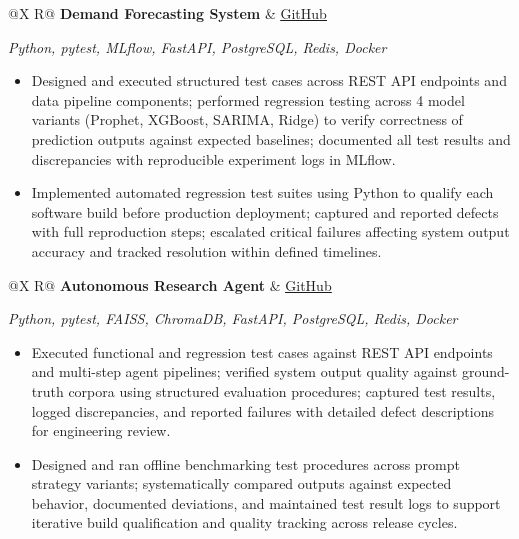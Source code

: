 \documentclass[a4paper,10pt]{article}
\newcommand{\ulink}[2]{\href{#1}{\uline{#2}}}
\newcommand{\subheading}[1]{{\color[HTML]{0A0A0A}\fontsize{12}{14}\selectfont\bfseries #1}}
\newcommand{\techstack}[1]{{\color[HTML]{5C5C5C}\fontsize{10.5}{12.5}\selectfont\itshape #1}}
\newcommand{\meta}[1]{{\color[HTML]{5C5C5C}\fontsize{10.5}{12.5}\selectfont #1}}
\begin{document}
\begin{tabularx}{\linewidth}{@{}X R@{}}
\subheading{Demand Forecasting System} & \meta{\ulink{https://github.com/su-jin1425/Demand-Forecasting-System}{GitHub}}
\end{tabularx}
\vspace{1pt}
\techstack{Python, pytest, MLflow, FastAPI, PostgreSQL, Redis, Docker}
\begin{itemize}[nosep, leftmargin=1.5em, itemsep=1pt, topsep=2pt]
\item {\color[HTML]{0A0A0A}\fontsize{11}{14}\selectfont
Designed and executed structured test cases across REST API endpoints and data pipeline components; performed regression testing across 4 model variants (Prophet, XGBoost, SARIMA, Ridge) to verify correctness of prediction outputs against expected baselines; documented all test results and discrepancies with reproducible experiment logs in MLflow.}
\item {\color[HTML]{0A0A0A}\fontsize{11}{14}\selectfont
Implemented automated regression test suites using Python to qualify each software build before production deployment; captured and reported defects with full reproduction steps; escalated critical failures affecting system output accuracy and tracked resolution within defined timelines.}
\end{itemize}

\vspace{4pt}

\begin{tabularx}{\linewidth}{@{}X R@{}}
\subheading{Autonomous Research Agent} & \meta{\ulink{https://github.com/su-jin1425/Autonomous-Research-Agent}{GitHub}}
\end{tabularx}
\vspace{1pt}
\techstack{Python, pytest, FAISS, ChromaDB, FastAPI, PostgreSQL, Redis, Docker}
\begin{itemize}[nosep, leftmargin=1.5em, itemsep=1pt, topsep=2pt]
\item {\color[HTML]{0A0A0A}\fontsize{11}{14}\selectfont
Executed functional and regression test cases against REST API endpoints and multi-step agent pipelines; verified system output quality against ground-truth corpora using structured evaluation procedures; captured test results, logged discrepancies, and reported failures with detailed defect descriptions for engineering review.}
\item {\color[HTML]{0A0A0A}\fontsize{11}{14}\selectfont
Designed and ran offline benchmarking test procedures across prompt strategy variants; systematically compared outputs against expected behavior, documented deviations, and maintained test result logs to support iterative build qualification and quality tracking across release cycles.}
\end{itemize}
\newpage
\vspace{4pt}
\end{document}
